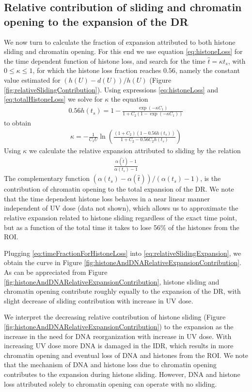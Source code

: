 \documentclass[12pt]{article}
\newcommand{\beq}{\begin{eqnarray}}
\newcommand{\eeq}{\end{eqnarray}}
\begin{document}
\subsection{Relative contribution of sliding and chromatin opening to the expansion of the DR}\label{subsection:RelativecontibutionOfSlidingAndOpeningToExpansion}

We now turn to calculate the fraction of expansion attributed to both histone sliding and chromatin opening. For this end we use equation \ref{eq:histoneLoss} for the time dependent function of histone loss, and search for the time $\hat{t}=\kappa t_s$, with $0\leq \kappa\leq 1$, for which the histone loss fraction reaches $0.56$, namely the constant value estimated for $(h(U)-d(U))/h(U)$ (Figure \ref{fig:relativeSlidingContribution}). Using expressions \ref{eq:histoneLoss} and \ref{eq:totalHistoneLoss} we solve for $\kappa$ the equation
\beq
0.56h(t_s)=1-\frac{\exp(-\kappa C_1)}{ 1+C_2(1-\exp(-\kappa C_1))}
\eeq
to obtain 
\beq \label{eq:timeFractionForHistoneLoss}
\kappa = -\frac{1}{C_1 U}\ln{\left( \frac{(1+C_2)(1-0.56h(t_s))}{1+C_2 -0.56C_2h(t_s)}\right)}
\eeq
Using $\kappa$ we calculate the relative expansion attributed to sliding by the relation 
\beq \label{eq:relativeSlidingExpansion}
\frac{\alpha(\hat{t})-1}{\alpha (t_s)-1}
\eeq
The complementary function $\left(\alpha(t_s)-\alpha(\hat{t})\right) /\left(\alpha(t_s)-1\right)$, is the contribution of chromatin opening to the total expansion of the DR. 
We note that the time dependent histone loss behaves in a near linear manner independent of UV dose (data not shown), which allows us to approximate the relative expansion related to histone sliding regardless of the exact time point, but as a function of the total time it takes to lose 56\% of the histones from the ROI. 

Plugging \ref{eq:timeFractionForHistoneLoss} into \ref{eq:relativeSlidingExpansion}, we obtain the curve in Figure \ref{fig:histoneAndDNARelativeExpansionContribution}. As can be appreciated from Figure \ref{fig:histoneAndDNARelativeExpansionContribution}, histone sliding and chromatin opening contribute roughly equally to the expansion of the DR, with slight decrease of sliding contribution with increase in UV dose.

We interpret the decreasing relative contribution of histone sliding (Figure \ref{fig:histoneAndDNARelativeExpansionContribution}) to the expansion as the increase in the need for DNA reorganization with increase in UV dose. With increasing UV dose more DNA is damaged in the IDR, which results in more chromatin opening and eventual loss of DNA and histones from the ROI. We note that the mechanism of DNA and histone loss due to chromatin opening contributes to the expansion during histone sliding. However, DNA and histone loss attributed solely to chromatin opening can operate with no sliding. 
\end{document}
